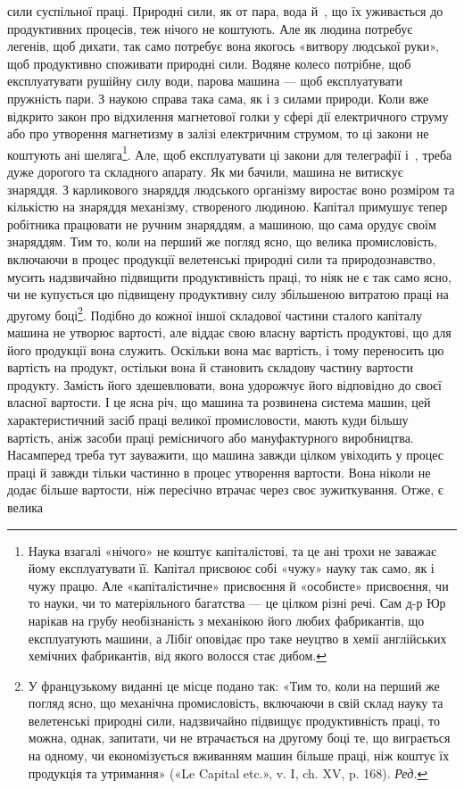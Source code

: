 \parcont{}  %
сили суспільної праці. Природні сили, як от пара, вода й~,
що їх уживається до продуктивних процесів, теж нічого не
коштують. Але як людина потребує легенів, щоб дихати, так само
потребує вона якогось «витвору людської руки», щоб продуктивно
споживати природні сили. Водяне колесо потрібне, щоб
експлуатувати рушійну силу води, парова машина — щоб експлуатувати
пружність пари. З наукою справа така сама, як і з силами
природи. Коли вже відкрито закон про відхилення магнетової
голки у сфері дії електричного струму або про утворення магнетизму
в залізі електричним струмом, то ці закони не коштують
ані шеляга\footnote{
Наука взагалі «нічого» не коштує капіталістові, та це ані трохи
не заважає йому експлуатувати її. Капітал присвоює собі «чужу» науку
так само, як і чужу працю. Але «капіталістичне» присвоєння й «особисте»
присвоєння, чи то науки, чи то матеріяльного багатства — це цілком різні
речі. Сам д-р Юр нарікав на грубу необізнаність з механікою його любих
фабрикантів, що експлуатують машини, а Лібіґ оповідає про таке неуцтво
в хемії англійських хемічних фабрикантів, від якого волосся стає дибом.
}. Але, щоб експлуатувати ці закони для телеграфії
і~, треба дуже дорогого та складного апарату. Як ми бачили,
машина не витискує знаряддя. З карликового знаряддя людського
організму виростає воно розміром та кількістю на знаряддя механізму,
створеного людиною. Капітал примушує тепер робітника
працювати не ручним знаряддям, а машиною, що сама орудує
своїм знаряддям. Тим то, коли на перший же погляд ясно, що
велика промисловість, включаючи в процес продукції велетенські
природні сили та природознавство, мусить надзвичайно
підвищити продуктивність праці, то ніяк не є так само ясно,
чи не купується цю підвищену продуктивну силу збільшеною
витратою праці на другому боці\footnote*{
У французькому виданні це місце подано так: «Тим то, коли на
перший же погляд ясно, що механічна промисловість, включаючи в свій
склад науку та велетенські природні сили, надзвичайно підвищує продуктивність
праці, то можна, однак, запитати, чи не втрачається на другому
боці те, що виграється на одному, чи економізується вживанням
машин більше праці, ніж коштує їх продукція та утримання» («Le Capital
etc.», v. I, ch. XV, p. 168). \emph{Ред.}
}. Подібно до кожної іншої складової
частини сталого капіталу машина не утворює вартості,
але віддає свою власну вартість продуктові, що для його продукції
вона служить. Оскільки вона має вартість, і тому переносить
цю вартість на продукт, остільки вона й становить складову
частину вартости продукту. Замість його здешевлювати, вона
удорожчує його відповідно до своєї власної вартости. І це ясна
річ, що машина та розвинена система машин, цей характеристичний
засіб праці великої промисловости, мають куди більшу вартість,
аніж засоби праці ремісничого або мануфактурного виробництва.
Насамперед треба тут зауважити, що машина завжди цілком
увіходить у процес праці й завжди тільки частинно в процес
утворення вартости. Вона ніколи не додає більше вартости,
ніж пересічно втрачає через своє зужиткування. Отже, є велика
\parbreak{}  %

